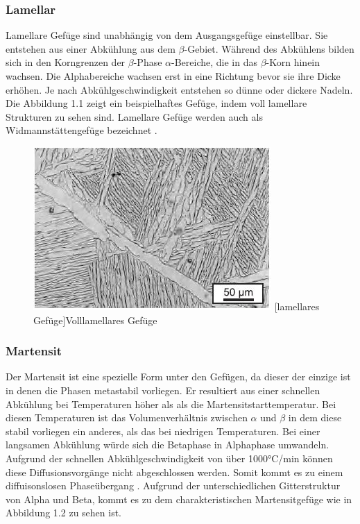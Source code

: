 \documentclass[a4paper, 11pt]{tubsreprt}
\begin{document}
\subsubsection{Lamellar}
Lamellare Gefüge sind unabhängig von dem Ausgangsgefüge einstellbar. Sie entstehen aus einer Abkühlung aus dem $\beta$-Gebiet. Während des Abkühlens bilden sich in den Korngrenzen der $\beta$-Phase $\alpha$-Bereiche, die in das $\beta$-Korn hinein wachsen. Die Alphabereiche wachsen erst in eine Richtung bevor sie ihre Dicke erhöhen. Je nach Abkühlgeschwindigkeit entstehen so dünne oder dickere Nadeln. Die Abbildung 1.1 zeigt ein beispielhaftes Gefüge, indem voll lamellare Strukturen zu sehen sind. Lamellare Gefüge werden auch als Widmannstättengefüge bezeichnet \cite{Luetjering2007}.


\begin{figure}


	\centering
		\includegraphics[scale=1]{Bilder/lamellar.jpg}
		[lamellares Gefüge]{Volllamellares Gefüge \cite{Leyens2002}}
		\label{fig1}
		
\end{figure}
\subsubsection{Martensit}
Der Martensit ist eine spezielle Form unter den Gefügen, da dieser der einzige ist in denen die Phasen metastabil vorliegen. Er resultiert aus einer schnellen Abkühlung bei Temperaturen höher als als die Martensitstarttemperatur. Bei diesen Temperaturen ist das Volumenverhältnis zwischen $\alpha$ und $\beta$ in dem diese stabil vorliegen ein anderes, als das bei niedrigen Temperaturen. Bei einer langsamen Abkühlung würde sich die Betaphase in Alphaphase umwandeln. Aufgrund der schnellen Abkühlgeschwindigkeit von über 1000°C/min können diese Diffusionsvorgänge nicht abgeschlossen werden. Somit kommt es zu einem diffuisonslosen Phaseübergang \cite{Luetjering2007}. Aufgrund der unterschiedlichen Gitterstruktur von Alpha und Beta, kommt es zu dem charakteristischen Martensitgefüge wie in Abbildung 1.2 zu sehen ist.
\end{document}
